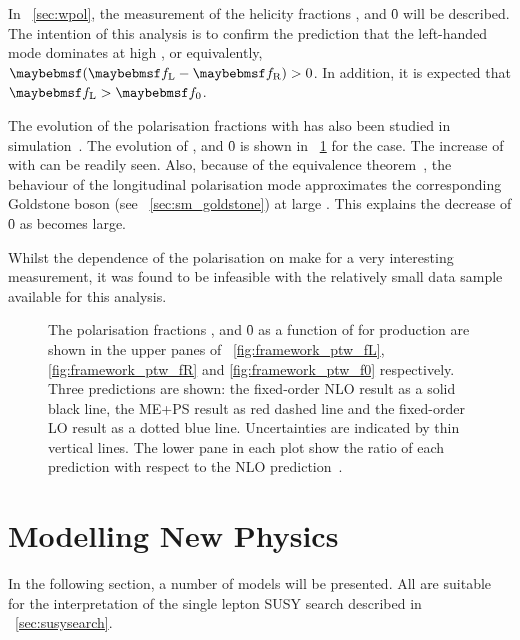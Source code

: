 In \chap~\ref{sec:wpol}, the measurement of the helicity fractions \fL, \fR and
\f0 will be described. The intention of this analysis is to confirm the
prediction that the left-handed mode dominates at high \PtW, or equivalently,
$\fLmfR > 0$. In addition, it is expected that $\fL > \f0$.

The evolution of the polarisation fractions with \PtW has also been studied in
simulation~\cite{berger_left_handed_w}. The evolution of \fL, \fR and \f0 is
shown in \fig~\ref{fig:framework_ptw} for the \PWp case. The increase of \fLmfR
with \PtW can be readily seen. Also, because of the equivalence
theorem~\cite{equiv_theorem,tev_physics,gounaris,cornwall,elementary_pp}, the
behaviour of the longitudinal polarisation mode approximates the corresponding
Goldstone boson (see \sec~\ref{sec:sm_goldstone}) at large \PtW. This explains
the decrease of \f0 as \PtW becomes large.

Whilst the dependence of the polarisation on \PtW make for a very interesting
measurement, it was found to be infeasible with the relatively small data sample
available for this analysis.

\begin{figure}
\centering
{}
\caption[The polarisation fractions, \fL, \fR and \f0 as a function of \PtW]{The
  polarisation fractions \fL, \fR and \f0 as a function of \PtW for \PWp
  production are shown in the upper panes of \figs~\ref{fig:framework_ptw_fL},
  \ref{fig:framework_ptw_fR} and \ref{fig:framework_ptw_f0} respectively. Three
  predictions are shown: the fixed-order \ac{NLO} result as a solid black line,
  the \ac{ME+PS} result as red dashed line and the fixed-order \ac{LO} result as
  a dotted blue line. Uncertainties are indicated by thin vertical lines. The
  lower pane in each plot show the ratio of each prediction with respect to the
  \ac{NLO} prediction~\cite{berger_left_handed_w}.}
\label{fig:framework_ptw}
\end{figure}

\section{Modelling New Physics}
\label{sec:framework_susy}
In the following section, a number of models will be presented. All are suitable
for the interpretation of the single lepton \ac{SUSY} search described in
\chap~\ref{sec:susysearch}.

